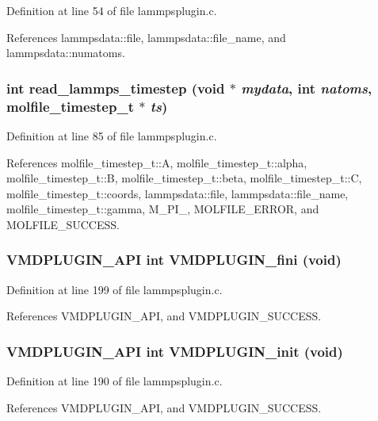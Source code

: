 Definition at line 54 of file lammpsplugin.c.

References lammpsdata::file, lammpsdata::file\_\-name, and lammpsdata::numatoms.
\subsubsection{\setlength{\rightskip}{0pt plus 5cm}int read\_\-lammps\_\-timestep (void $\ast$ {\em mydata}, int {\em natoms}, {\bf molfile\_\-timestep\_\-t} $\ast$ {\em ts})\hspace{0.3cm}{\tt  [static]}}\label{lammpsplugin_8c_a3}




Definition at line 85 of file lammpsplugin.c.

References molfile\_\-timestep\_\-t::A, molfile\_\-timestep\_\-t::alpha, molfile\_\-timestep\_\-t::B, molfile\_\-timestep\_\-t::beta, molfile\_\-timestep\_\-t::C, molfile\_\-timestep\_\-t::coords, lammpsdata::file, lammpsdata::file\_\-name, molfile\_\-timestep\_\-t::gamma, M\_\-PI\_, MOLFILE\_\-ERROR, and MOLFILE\_\-SUCCESS.
\subsubsection{\setlength{\rightskip}{0pt plus 5cm}VMDPLUGIN\_\-API int VMDPLUGIN\_\-fini (void)}\label{lammpsplugin_8c_a7}




Definition at line 199 of file lammpsplugin.c.

References VMDPLUGIN\_\-API, and VMDPLUGIN\_\-SUCCESS.
\subsubsection{\setlength{\rightskip}{0pt plus 5cm}VMDPLUGIN\_\-API int VMDPLUGIN\_\-init (void)}\label{lammpsplugin_8c_a5}




Definition at line 190 of file lammpsplugin.c.

References VMDPLUGIN\_\-API, and VMDPLUGIN\_\-SUCCESS.
